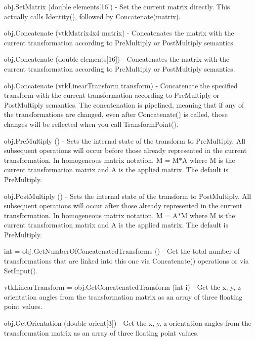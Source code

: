 \begin{DoxyItemize}
\item {\ttfamily obj.\-Set\-Matrix (double elements\mbox{[}16\mbox{]})} -\/ Set the current matrix directly. This actually calls Identity(), followed by Concatenate(matrix).  
\item {\ttfamily obj.\-Concatenate (vtk\-Matrix4x4 matrix)} -\/ Concatenates the matrix with the current transformation according to Pre\-Multiply or Post\-Multiply semantics.  
\item {\ttfamily obj.\-Concatenate (double elements\mbox{[}16\mbox{]})} -\/ Concatenates the matrix with the current transformation according to Pre\-Multiply or Post\-Multiply semantics.  
\item {\ttfamily obj.\-Concatenate (vtk\-Linear\-Transform transform)} -\/ Concatenate the specified transform with the current transformation according to Pre\-Multiply or Post\-Multiply semantics. The concatenation is pipelined, meaning that if any of the transformations are changed, even after Concatenate() is called, those changes will be reflected when you call Transform\-Point().  
\item {\ttfamily obj.\-Pre\-Multiply ()} -\/ Sets the internal state of the transform to Pre\-Multiply. All subsequent operations will occur before those already represented in the current transformation. In homogeneous matrix notation, M = M$\ast$\-A where M is the current transformation matrix and A is the applied matrix. The default is Pre\-Multiply.  
\item {\ttfamily obj.\-Post\-Multiply ()} -\/ Sets the internal state of the transform to Post\-Multiply. All subsequent operations will occur after those already represented in the current transformation. In homogeneous matrix notation, M = A$\ast$\-M where M is the current transformation matrix and A is the applied matrix. The default is Pre\-Multiply.  
\item {\ttfamily int = obj.\-Get\-Number\-Of\-Concatenated\-Transforms ()} -\/ Get the total number of transformations that are linked into this one via Concatenate() operations or via Set\-Input().  
\item {\ttfamily vtk\-Linear\-Transform = obj.\-Get\-Concatenated\-Transform (int i)} -\/ Get the x, y, z orientation angles from the transformation matrix as an array of three floating point values.  
\item {\ttfamily obj.\-Get\-Orientation (double orient\mbox{[}3\mbox{]})} -\/ Get the x, y, z orientation angles from the transformation matrix as an array of three floating point values.  

\end{DoxyItemize}
